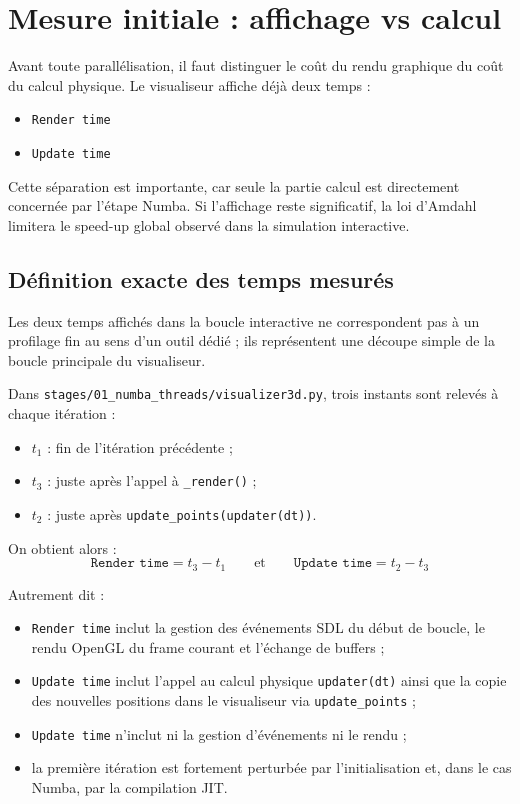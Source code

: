 \section{Mesure initiale : affichage vs calcul}

Avant toute parallélisation, il faut distinguer le coût du rendu graphique du coût du calcul physique. Le visualiseur affiche déjà deux temps :
\begin{itemize}
    \item \texttt{Render time}
    \item \texttt{Update time}
\end{itemize}

Cette séparation est importante, car seule la partie calcul est directement concernée par l'étape Numba. Si l'affichage reste significatif, la loi d'Amdahl limitera le speed-up global observé dans la simulation interactive.

\subsection{Définition exacte des temps mesurés}

Les deux temps affichés dans la boucle interactive ne correspondent pas à un profilage fin au sens d'un outil dédié ; ils représentent une découpe simple de la boucle principale du visualiseur.

Dans \texttt{stages/01\_numba\_threads/visualizer3d.py}, trois instants sont relevés à chaque itération :
\begin{itemize}
    \item \(t_1\) : fin de l'itération précédente ;
    \item \(t_3\) : juste après l'appel à \texttt{\_render()} ;
    \item \(t_2\) : juste après \texttt{update\_points(updater(dt))}.
\end{itemize}

On obtient alors :
\[
\texttt{Render time} = t_3 - t_1
\qquad\text{et}\qquad
\texttt{Update time} = t_2 - t_3
\]

Autrement dit :
\begin{itemize}
    \item \texttt{Render time} inclut la gestion des événements SDL du début de boucle, le rendu OpenGL du frame courant et l'échange de buffers ;
    \item \texttt{Update time} inclut l'appel au calcul physique \texttt{updater(dt)} ainsi que la copie des nouvelles positions dans le visualiseur via \texttt{update\_points} ;
    \item \texttt{Update time} n'inclut ni la gestion d'événements ni le rendu ;
    \item la première itération est fortement perturbée par l'initialisation et, dans le cas Numba, par la compilation JIT.
\end{itemize}

